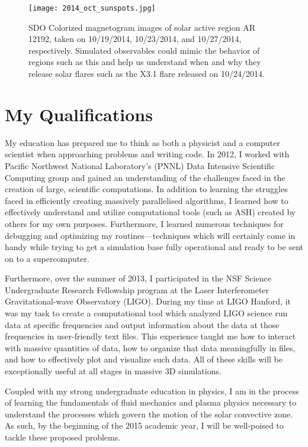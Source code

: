 \documentclass[aasms,12pt]{article}
\begin{document}
\begin{figure}[t!]
\centering
\texttt{[image: 2014\_oct\_sunspots.jpg]}
\caption{SDO Colorized magnetogram images of solar active region AR 12192, taken
	on 10/19/2014, 10/23/2014, and 10/27/2014, respectively.  Simulated
	observables could mimic the behavior of regions such as this and help
	us understand when and why they release solar flares such as the X3.1
	flare released on 10/24/2014.
	\label{AR12192}}
\end{figure}

\section{My Qualifications}
My education has prepared me to think as both a physicist and a computer
scientist when approaching problems and writing code.  In 2012, I worked with
Pacific Northwest National Laboratory's (PNNL) Data Intensive Scientific
Computing group and gained an understanding of the challenges faced in the
creation of large, scientific computations.  In addition to learning the
struggles faced in efficiently creating massively parallelised algorithms,
I learned how to effectively understand and utilize computational tools 
(such as ASH) created by others for my own purposes. Furthermore, I learned
numerous techniques for debugging and optimizing my routines---techniques
which will certainly come in handy while trying to get a simulation base
fully operational and ready to be sent on to a supercomputer.

Furthermore, over the summer of 2013, I participated in the NSF Science
Undergraduate Research Fellowship program at the Laser Interferometer
Gravitational-wave Observatory (LIGO).  During my time at LIGO Hanford, it was
my task to create a computational tool which analyzed LIGO science run data at
specific frequencies and output information about the data at those frequencies
in user-friendly text files.  This experience taught me how to interact with
massive quantities of data, how to organize that data meaningfully in files,
and how to effectively plot and visualize such data.  All of these skills
will be exceptionally useful at all stages in massive 3D simulations.

Coupled with my strong undergraduate education in physics, I am in the process
of learning the fundamentals of fluid mechanics and plasma physics necessary to
understand the processes which govern the motion of the solar convective zone.
As such, by the beginning of the 2015 academic year, I will be well-poised to
tackle these proposed problems. 
\end{document}
